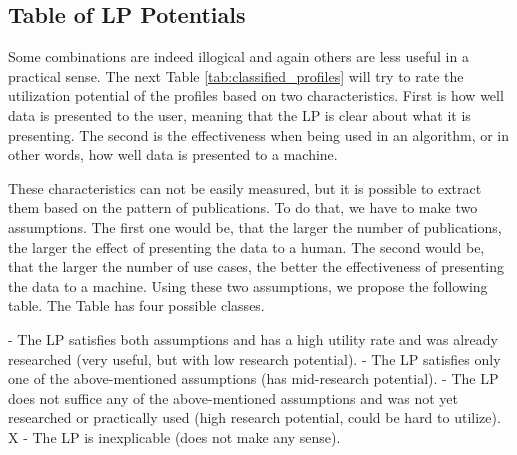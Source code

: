 \subsection{Table of LP Potentials} \label{subsec:potential}

Some combinations are indeed illogical and again others are less useful in a practical sense.
The next Table \ref{tab:classified_profiles} will try to rate the utilization potential of the profiles based on two characteristics. 
First is how well data is presented to the user,
meaning that the LP is clear about what it is presenting.
The second is the effectiveness when being used in an algorithm, or in other words, how well data is presented to a machine. 

These characteristics can not be easily measured,
but it is possible to extract them based on the pattern of publications.
To do that, we have to make two assumptions.
The first one would be, that the larger the number of publications, the larger the effect of presenting the data to a human.
The second would be, that the larger the number of use cases, the better the effectiveness of presenting the data to a machine.
Using these two assumptions, we propose the following table. 
The Table has four possible classes. 

\begin{outline} 
 - The LP satisfies both assumptions and has a high utility rate and was already researched (very useful, but with low research potential). 
 - The LP satisfies only one of the above-mentioned assumptions (has mid-research potential).
 - The LP does not suffice any of the above-mentioned assumptions and was not yet researched or practically used (high research potential, could be hard to utilize).
\1 X - The LP is inexplicable (does not make any sense).
\end{outline}

